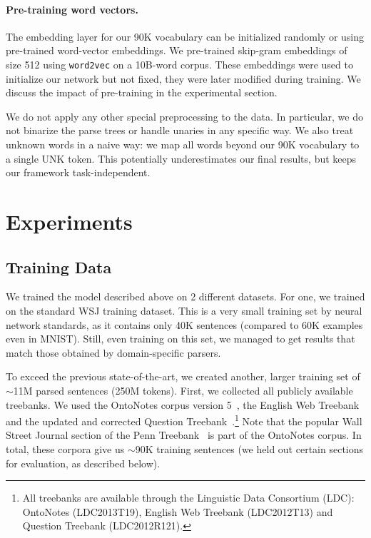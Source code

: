 \documentclass{article} \usepackage{nips15submit_e,times}
\newcommand\citep\cite
\begin{document}
\paragraph{Pre-training word vectors.}
The embedding layer for our 90K vocabulary can be initialized randomly or
using pre-trained word-vector embeddings. We pre-trained skip-gram embeddings
of size 512 using \texttt{word2vec} \citep{mikolov2013efficient} on a 10B-word
corpus. These embeddings were used to initialize our network but not fixed,
they were later modified during training. We discuss the impact of pre-training
in the experimental section.

We do not apply any other special preprocessing to the data.
In particular, we do not binarize the parse trees or handle unaries
in any specific way. We also treat unknown words in a naive way:
we map all words beyond our 90K vocabulary to a single UNK token.
This potentially underestimates our final results, but keeps our
framework task-independent.
 \vspace{-3mm}
\section{Experiments}
\label{sec:exp}

\subsection{Training Data}

We trained the model described above on 2 different datasets.
For one, we trained on the standard WSJ training dataset.
This is a very small training set by neural network standards, as it contains
only 40K sentences (compared to 60K examples even in MNIST).
Still, even training on this set, we managed to get results that
match those obtained by domain-specific parsers.

To exceed the previous state-of-the-art, we created another, larger training
set of $\sim$11M parsed sentences (250M tokens). First, we collected all
publicly available treebanks.
We used the OntoNotes corpus version 5~\citep{hovy-EtAl:2006:NAACL},
the English Web Treebank~\citep{petrov-mcdonald:2012:SANCL} and the updated
and corrected Question Treebank~\citep{judge-etAl:2006:ACL}.\footnote{All
treebanks are available through the Linguistic Data Consortium
(LDC): OntoNotes (LDC2013T19), English Web Treebank (LDC2012T13) and
Question Treebank (LDC2012R121).}
Note that the popular Wall Street Journal section of the Penn
Treebank~\citep{marcus:1993:CL} is part of the OntoNotes corpus.
In total, these corpora give us $\sim$90K training sentences (we held out
certain sections for evaluation, as described below).
\end{document}
